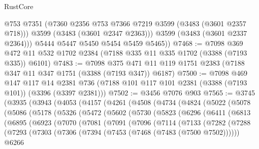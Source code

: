 \begin{lexlean}{RustCore}
\begin{coremodule}
            @753
            @7351
            (@7360 @2356 @753 @7366 @7219 @3599 (@3483 (@3601 @2357 @718)))
            @3599
            (@3483 (@3601 @2347 @2363)))
          @3599
          (@3483 (@3601 @2337 @2364)))
        @5444
        @5447
        @5450
        @5454
        @5459
        @5465))
@7468 := @7098 @369 @472 @11 @532 @1702 @2384 (@7188 @335 @11 @335 @1702 (@3388 (@7193 @335)) @6101)
@7483 := @7098 @375 @471 @11 @119 @1751 @2383 (@7188 @347 @11 @347 @1751 (@3388 (@7193 @347)) @6187)
@7500 := @7098
    @469
    @147
    @117
    @14
    @2381
    @736
    (@7188 @101 @117 @101 @2381 (@3388 (@7193 @101)) (@3396 (@3397 @2381)))
@7502 := @3456 @7076 @903
@7565 := @3745
    (@3935
      (@3943
        (@4053
          (@4157
            (@4261
              (@4508
                (@4734
                  (@4824
                    (@5022
                      (@5078
                        (@5086
                          (@5178
                            (@5326
                              (@5472
                                (@5602
                                  (@5730
                                    (@5823
                                      (@6296
                                        (@6411
                                          (@6813
                                            (@6895
                                              (@6923
                                                (@7070
                                                  (@7081
                                                    (@7091
                                                      (@7096
                                                        (@7114
                                                          (@7133
                                                            (@7282
                                                              (@7288
                                                                (@7293
                                                                  (@7303
                                                                    (@7306
                                                                      (@7394
                                                                        (@7453
                                                                          (@7468
                                                                            (@7483
                                                                              (@7500 @7502))))))
                                                                    @6266

\end{coremodule}
\end{lexlean}
